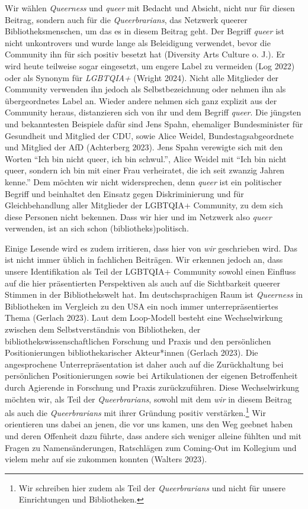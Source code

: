 \documentclass[a4paper,
fontsize=11pt,
oneside,
numbers=noperiodatend,
parskip=half-,
bibliography=totoc,
final
]{scrartcl}
\begin{document}
Wir wählen \emph{Queerness} und \emph{queer} mit Bedacht und Absicht,
nicht nur für diesen Beitrag, sondern auch für die \emph{Queerbrarians},
das Netzwerk queerer Bibliotheksmenschen, um das es in diesem Beitrag
geht. Der Begriff \emph{queer} ist nicht unkontrovers und wurde lange
als Beleidigung verwendet, bevor die Community ihn für sich positiv
besetzt hat (Diversity Arts Culture o. J.). Er wird heute teilweise
sogar eingesetzt, um engere Label zu vermeiden (Log 2022) oder als
Synonym für \emph{LGBTQIA+} (Wright 2024). Nicht alle Mitglieder der
Community verwenden ihn jedoch als Selbstbezeichnung oder nehmen ihn als
übergeordnetes Label an. Wieder andere nehmen sich ganz explizit aus der
Community heraus, distanzieren sich von ihr und dem Begriff
\emph{queer}. Die jüngsten und bekanntesten Beispiele dafür sind Jens
Spahn, ehemaliger Bundesminister für Gesundheit und Mitglied der CDU,
sowie Alice Weidel, Bundestagsabgeordnete und Mitglied der AfD
(Achterberg 2023). Jens Spahn verewigte sich mit den Worten \enquote{Ich
bin nicht queer, ich bin schwul.}, Alice Weidel mit \enquote{Ich bin
nicht queer, sondern ich bin mit einer Frau verheiratet, die ich seit
zwanzig Jahren kenne.} Dem möchten wir nicht widersprechen, denn
\emph{queer} ist ein politischer Begriff und beinhaltet den Einsatz
gegen Diskriminierung und für Gleichbehandlung aller Mitglieder der
LGBTQIA+ Community, zu dem sich diese Personen nicht bekennen. Dass wir hier und im Netzwerk also \emph{queer}
verwenden, ist an sich schon (bibliotheks)politisch.

Einige Lesende wird es zudem irritieren, dass hier von \emph{wir}
geschrieben wird. Das ist nicht immer üblich in fachlichen Beiträgen.
Wir erkennen jedoch an, dass unsere Identifikation als Teil der LGBTQIA+
Community sowohl einen Einfluss auf die hier präsentierten Perspektiven
als auch auf die Sichtbarkeit queerer Stimmen in der Bibliothekswelt
hat. Im deutschsprachigen Raum ist \emph{Queerness} in Bibliotheken im
Vergleich zu den USA ein noch immer unterrepräsentiertes Thema (Gerlach
2023). Laut dem Loop-Modell besteht eine Wechselwirkung zwischen dem
Selbstverständnis von Bibliotheken, der bibliothekswissenschaftlichen
Forschung und Praxis und den persönlichen Positionierungen
bibliothekarischer Akteur*innen (Gerlach 2023). Die angesprochene
Unterrepräsentation ist daher auch auf die Zurückhaltung bei
persönlichen Positionierungen sowie bei Artikulationen der eigenen
Betroffenheit durch Agierende in Forschung und Praxis zurückzuführen.
Diese Wechselwirkung möchten wir, als Teil der \emph{Queerbrarians},
sowohl mit dem \emph{wir} in diesem Beitrag als auch die
\emph{Queerbrarians} mit ihrer Gründung positiv verstärken.\footnote{Wir
  schreiben hier zudem als Teil der \emph{Queerbrarians} und nicht für
  unsere Einrichtungen und Bibliotheken.} Wir orientieren uns dabei an
jenen, die vor uns kamen, uns den Weg geebnet haben und deren Offenheit
dazu führte, dass andere sich weniger alleine fühlten und mit Fragen zu
Namensänderungen, Ratschlägen zum Coming-Out im Kollegium und vielem
mehr auf sie zukommen konnten (Walters 2023).
\end{document}
